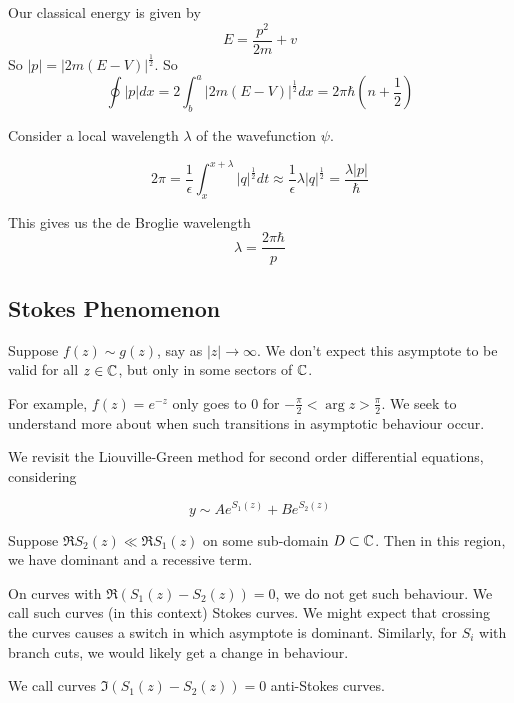 \documentclass[a4paper]{article}
\begin{document}
\begin{eg}
	Our classical energy is given by
	 \[
	E = \frac{p^2}{2m} + v
	\] 
	So $|p| = |2m(E-V)|^{\frac{1}{2}}$. So
	\[
		\oint |p| dx = 2 \int_{b}^{a} |2m(E-V)|^{\frac{1}{2}} dx = 2\pi \hbar (n + \frac{1}{2})
	\] 

	Consider a local wavelength $\lambda$ of the wavefunction $\psi$. 

	\[
	2\pi = \frac{1}{\epsilon}\int_{x}^{x+\lambda} |q|^{\frac{1}{2}} dt \approx \frac{1}{\epsilon} \lambda |q|^{\frac{1}{2}} = \frac{\lambda |p|}{\hbar}
	\] 

	This gives us the de Broglie wavelength
	\[
	\lambda = \frac{2\pi \hbar}{p}
	\] 
\end{eg}

\subsection{Stokes Phenomenon}

Suppose $f(z) \sim g(z)$, say as $|z| \to  \infty$. We don't expect this asymptote to be valid for all  $z \in \mathbb{C}$, but only in some sectors of $\mathbb{C}$.

For example, $f(z) = e^{-z}$ only goes to 0 for $-\frac{\pi}{2} < \arg z > \frac{\pi}{2}$. We seek to understand more about when such transitions in asymptotic behaviour occur.

\vspace{1em}

We revisit the Liouville-Green method for second order differential equations, considering

\[
	y \sim  A e^{S_1(z)} + Be^{S_2(z)}
\]

Suppose $\Re S_2(z) \ll \Re S_1(z)$ on some sub-domain $D \subset \mathbb{C}$. Then in this region, we have  dominant and a recessive term.

On curves with  $\Re \left( S_1(z) - S_2(z) \right) =0$, we do not get such behaviour. We call such curves (in this context) Stokes curves. We might expect that crossing the curves causes a switch in which asymptote is dominant. Similarly, for $S_i$ with branch cuts, we would likely get a change in behaviour.

We call curves $\Im \left( S_1(z) - S_2(z) \right) =0$ anti-Stokes curves.
\end{document}

